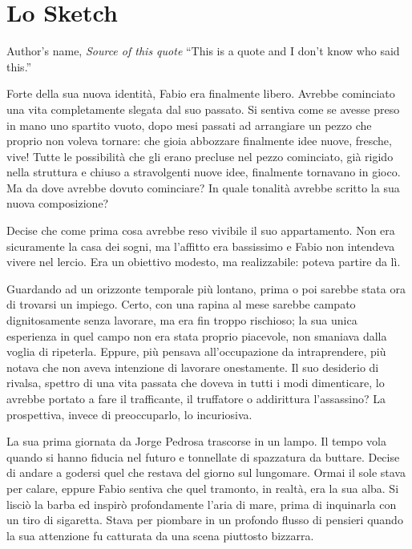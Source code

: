 \chapter{Lo Sketch}

\begin{chapquote}{Author's name, \textit{Source of this quote}}
``This is a quote and I don't know who said this.''
\end{chapquote}


Forte della sua nuova identità, Fabio era finalmente libero. Avrebbe cominciato una vita completamente slegata dal suo passato. Si sentiva come se avesse preso in mano uno spartito vuoto, dopo mesi passati ad arrangiare un pezzo che proprio non voleva tornare: che gioia abbozzare finalmente idee nuove, fresche, vive! Tutte le possibilità che gli erano precluse nel pezzo cominciato, già rigido nella struttura e chiuso a stravolgenti nuove idee, finalmente tornavano in gioco. Ma da dove avrebbe dovuto cominciare? In quale tonalità avrebbe scritto la sua nuova composizione?

Decise che come prima cosa avrebbe reso vivibile il suo appartamento. Non era sicuramente la casa dei sogni, ma l'affitto era bassissimo e Fabio non intendeva vivere nel lercio. Era un obiettivo modesto, ma realizzabile: poteva partire da lì.

Guardando ad un orizzonte temporale più lontano, prima o poi sarebbe stata ora di trovarsi un impiego. Certo, con una rapina al mese sarebbe campato dignitosamente senza lavorare, ma era fin troppo rischioso; la sua unica esperienza in quel campo non era stata proprio piacevole, non smaniava dalla voglia di ripeterla. Eppure, più pensava all'occupazione da intraprendere, più notava che non aveva intenzione di lavorare onestamente. Il suo desiderio di rivalsa, spettro di una vita passata che doveva in tutti i modi dimenticare, lo avrebbe portato a fare il trafficante, il truffatore o addirittura l'assassino? La prospettiva, invece di preoccuparlo, lo incuriosiva.

La sua prima giornata da Jorge Pedrosa trascorse in un lampo. Il tempo vola quando si hanno fiducia nel futuro e tonnellate di spazzatura da buttare. Decise di andare a godersi quel che restava del giorno sul lungomare. Ormai il sole stava per calare, eppure Fabio sentiva che quel tramonto, in realtà, era la sua alba. Si lisciò la barba ed inspirò profondamente l'aria di mare, prima di inquinarla con un tiro di sigaretta. Stava per piombare in un profondo flusso di pensieri quando la sua attenzione fu catturata da una scena piuttosto bizzarra.

